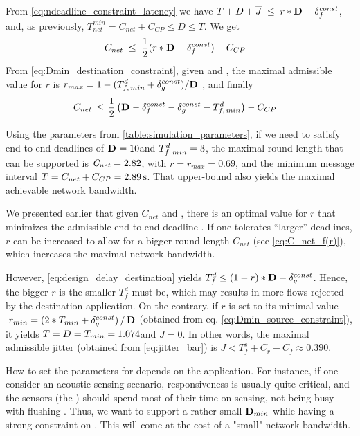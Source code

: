 From \eqref{eq:ndeadline_constraint_latency} we have
$T + D + \overline{J}\;
	\leq  \; r * \mathbf{D}_{\mathit{}} - \delta_f^{const}$, and, \linebreak
as previously, $T_{net}^{min} = C_{net} + C_{CP} \leq D \leq T$.
We get
\begin{align}
\label{eq:C_net_f(r)}
& C_{net}
		\;\leq\;
		 \frac{1}{2}
		 	(r * \deadlineany - \delta_f^{const}) - C_{CP}
%
\end{align}
From \eqref{eq:Dmin_destination_constraint}, given \deadlineany and \tfdmin, the maximal admissible value for $r$ is $\displaystyle r_{max} = 1 - ({T^{d}_{f, \,min} + \delta^{const}_g}) / \mathbf{D}_{\mathit{}}$ , and finally
\begin{align}
\label{eq:C_net_upperbound}
	& C_{net}
		\,\leq\,
		 \frac{1}{2}
		 	\left(
		 	\mathbf{D}_{\mathit{}} - \delta_f^{const}- \delta_g^{const} - T^{d}_{f, \,min}
		 	\right)
		 - C_{CP}
\end{align}

Using the parameters from \cref{table:simulation_parameters}, if we need to satisfy end-to-end deadlines of $\mathbf{D}_{\mathit{}} = 10$\s and $T^{d}_{f, \,min} = 3$\s, the maximal round length that can be supported is $\mathit{C_{net}} = 2.82$\s, with $r = r_{max} = 0.69$, and the minimum message interval $T = C_{net} + C_{CP} = 2.89\,\text{s}$. That upper-bound also yields the maximal achievable network bandwidth.


We presented earlier that given $C_{net}$ and \tfdmin, there is an optimal value for $r$ that minimizes the admissible end-to-end deadline \deadlineany. If one tolerates ``larger'' deadlines, $r$ can be increased to allow for a bigger round length $C_{net}$ (see \eqref{eq:C_net_f(r)}), which increases the maximal network bandwidth.

However, \eqref{eq:design_delay_destination} yields $T_f^d \leq (1-r)*\mathbf{D}_{\mathit{}} - \delta_g^{const}$. Hence, the bigger $r$ is the smaller $T_f^d$ must be, which may results in more flows rejected by the destination application.
On the contrary, if $r$ is set to its minimal value \linebreak
$\;r_{min} = ({2*T_{min} +  \delta^{const}_g})\, /\, {\mathbf{D}_{\mathit{}}}$ (obtained from eq. \eqref{eq:Dmin_source_constraint}), it yields $T = D_{\mathit{}} = T_{min} = 1.074$\s and $\overline{J} = 0$\s. In other words, the maximal admissible jitter (obtained from \eqref{eq:jitter_bar}) is \linebreak
$J < T_f^s + C_r - C_f \approx 0.390$\s.

How to set the parameters for \DRP depends on the application. For instance, if one consider an acoustic sensing scenario, responsiveness is usually quite critical, and the sensors (\ie the \APs) should spend most of their time on sensing, not being busy with flushing \bolt. Thus, we want to support a rather small $\mathbf{D}_{min}$ while having a strong constraint on \tfdmin. This will come at the cost of a "small" network bandwidth.
